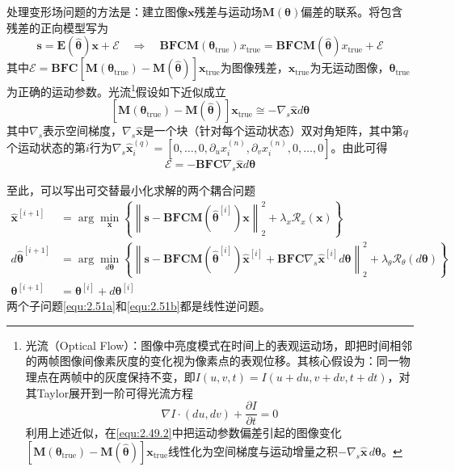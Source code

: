 \documentclass[12pt]{article}
\begin{document}
处理变形场问题的方法是：建立图像$\bm{x}$残差与运动场$\mathbf{M}(\bm{\theta})$偏差的联系。将包含残差的正向模型写为
\begin{equation}
    \bm{s}=\mathbf{E}(\hat{\bm{\theta}})\bm{x}+\mathcal{E}
    \quad\Rightarrow\quad
    \mathbf{B}\mathbf{F}\mathbf{C}\mathbf{M}(\bm{\theta}_\mathrm{true})x_\mathrm{true}=\mathbf{B}\mathbf{F}\mathbf{C}\mathbf{M}(\hat{\bm{\theta}})x_\mathrm{true}+\mathcal{E}
\end{equation}
其中$\mathcal{E}=\mathbf{B}\mathbf{F}\mathbf{C}\left[\mathbf{M}(\bm{\theta}_\mathrm{true})-\mathbf{M}(\hat{\bm{\theta}})\right]\bm{x}_\mathrm{true}$为图像残差，$\bm{x}_\mathrm{true}$为无运动图像，$\bm{\theta}_\mathrm{true}$为正确的运动参数。光流\footnote{光流（Optical Flow）：图像中亮度模式在时间上的表观运动场，即把时间相邻的两帧图像间像素灰度的变化视为像素点的表观位移。其核心假设为：同一物理点在两帧中的灰度保持不变，即$I(u,v,t)=I(u+du,v+dv,t+dt)$，对其Taylor展开到一阶可得光流方程
\begin{equation}
    \nabla I\cdot(du,dv)+\frac{\partial I}{\partial t}=0
\end{equation}
利用上述近似，在\autoref{equ:2.49.2}中把运动参数偏差引起的图像变化$\left[\mathbf{M}(\bm{\theta}_\mathrm{true})-\mathbf{M}(\hat{\bm{\theta}})\right]\bm{x}_\mathrm{true}$线性化为空间梯度与运动增量之积$-\nabla_s\hat{\bm{x}}\,d\bm{\theta}$。}假设如下近似成立
\begin{equation}
    \left[\mathbf{M}(\bm{\theta}_\mathrm{true})-\mathbf{M}(\hat{\bm{\theta}})\right]\bm{x}_\mathrm{true}\cong-\nabla_s\hat{\bm{x}}d\bm{\theta}
    \label{equ:2.49.2}
\end{equation}
其中$\nabla_s$表示空间梯度，$\nabla_s\hat{\bm{x}}$是一个块（针对每个运动状态）双对角矩阵，其中第$q$个运动状态的第$i$行为$\nabla_s\hat{\bm{x}}_i^{(q)}=\left[0,\ldots,0,\partial_u x_i^{(n)},\partial_v x_i^{(n)},0,\ldots,0\right]$。由此可得
\begin{equation}
    \mathcal{E}=-\mathbf{B}\mathbf{F}\mathbf{C}\nabla_s\hat{\bm{x}}d\bm{\theta}
    \label{equ:2.50}
\end{equation}

至此，可以写出可交替最小化求解的两个耦合问题
\begin{align}
    \hat{\bm{x}}^{[i+1]}&=\arg\min_{\bm{x}} \left\{\left\|\bm{s}-\mathbf{B}\mathbf{F}\mathbf{C}\mathbf{M}\left(\hat{\bm{\theta}}^{[i]}\right)\bm{x}\right\|_2^2+\lambda_x\mathcal{R}_x(\bm{x})\right\} \label{equ:2.51a} \\
    d\hat{\bm{\theta}}^{[i+1]}&=\arg\min_{d\bm{\theta}} \left\{\left\|\bm{s}-\mathbf{B}\mathbf{F}\mathbf{C}\mathbf{M}\left(\hat{\bm{\theta}}^{[i]}\right)\hat{\bm{x}}^{[i]}+\mathbf{B}\mathbf{F}\mathbf{C}\nabla_s\hat{\bm{x}}^{[i]} d\bm{\theta}\right\|_2^2+\lambda_\theta\mathcal{R}_\theta(d\bm{\theta})\right\} \label{equ:2.51b} \\
    \bm{\theta}^{[i+1]}&=\bm{\theta}^{[i]}+d\bm{\theta}^{[i]}
\end{align}
两个子问题\autoref{equ:2.51a}和\autoref{equ:2.51b}都是线性逆问题。
\end{document}

